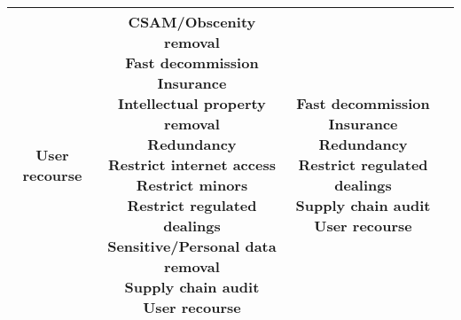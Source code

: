 \documentclass[fleqn]{article}
\begin{document}
\begin{landscape}
\begin{table}[H]
\begin{tabular}{|c|c|c|c|}
{			\textbullet\hspace{3pt} User recourse \\ 		 	 	 
		}
		& \makecell[l]{
			\textbullet\hspace{3pt} CSAM/Obscenity removal \\ 	
			\textbullet\hspace{3pt} Fast decommission \\ 	
			\textbullet\hspace{3pt} Insurance \\ 	
			\textbullet\hspace{3pt} Intellectual property removal \\ 	
			\textbullet\hspace{3pt} Redundancy \\ 	
			\textbullet\hspace{3pt} Restrict internet access \\ 	
			\textbullet\hspace{3pt} Restrict minors \\ 	
			\textbullet\hspace{3pt} Restrict regulated dealings \\ 	
			\textbullet\hspace{3pt} Sensitive/Personal data removal \\ 	
			\textbullet\hspace{3pt} Supply chain audit \\ 	
			\textbullet\hspace{3pt} User recourse \\					 	 
		}
		& \makecell[l]{
			\textbullet\hspace{3pt} Fast decommission \\ 	
			\textbullet\hspace{3pt} Insurance \\ 	
			\textbullet\hspace{3pt} Redundancy \\ 	
			\textbullet\hspace{3pt} Restrict regulated dealings \\ 	
			\textbullet\hspace{3pt} Supply chain audit \\ 	
			\textbullet\hspace{3pt} User recourse \\  					 	 
		}
		\\
		\hline
	\end{tabular}
	\label{table:high_risk_plan_by_tc_cont}
\end{table}


\end{landscape}
\end{document}
